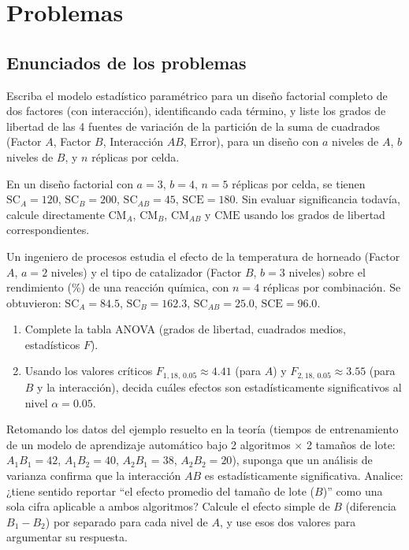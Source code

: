 \section*{Problemas}

\subsection*{Enunciados de los problemas}

\begin{problema}
	\label{prob:11b9df2}
	Escriba el modelo estadístico paramétrico para un diseño factorial completo de dos factores (con interacción), identificando cada término, y liste los grados de libertad de las 4 fuentes de variación de la partición de la suma de cuadrados (Factor $A$, Factor $B$, Interacción $AB$, Error), para un diseño con $a$ niveles de $A$, $b$ niveles de $B$, y $n$ réplicas por celda.
\end{problema}

\begin{problema}
	\label{prob:196fe5a}
	En un diseño factorial con $a=3$, $b=4$, $n=5$ réplicas por celda, se tienen $\text{SC}_A = 120$, $\text{SC}_B = 200$, $\text{SC}_{AB} = 45$, $\text{SCE} = 180$. Sin evaluar significancia todavía, calcule directamente $\text{CM}_A$, $\text{CM}_B$, $\text{CM}_{AB}$ y $\text{CME}$ usando los grados de libertad correspondientes.
\end{problema}

\begin{problema}
	\label{prob:414074b}
	Un ingeniero de procesos estudia el efecto de la temperatura de horneado (Factor $A$, $a=2$ niveles) y el tipo de catalizador (Factor $B$, $b=3$ niveles) sobre el rendimiento (\%) de una reacción química, con $n=4$ réplicas por combinación. Se obtuvieron: $\text{SC}_A = 84.5$, $\text{SC}_B = 162.3$, $\text{SC}_{AB} = 25.0$, $\text{SCE} = 96.0$.
	\begin{enumerate}
		\item Complete la tabla ANOVA (grados de libertad, cuadrados medios, estadísticos $F$).
		\item Usando los valores críticos $F_{1,18,\,0.05} \approx 4.41$ (para $A$) y $F_{2,18,\,0.05} \approx 3.55$ (para $B$ y la interacción), decida cuáles efectos son estadísticamente significativos al nivel $\alpha = 0.05$.
	\end{enumerate}
\end{problema}

\begin{problema}
	\label{prob:64cf64c}
	Retomando los datos del ejemplo resuelto en la teoría (tiempos de entrenamiento de un modelo de aprendizaje automático bajo 2 algoritmos $\times$ 2 tamaños de lote: $A_1B_1=42$, $A_1B_2=40$, $A_2B_1=38$, $A_2B_2=20$), suponga que un análisis de varianza confirma que la interacción $AB$ es estadísticamente significativa. Analice: ¿tiene sentido reportar ``el efecto promedio del tamaño de lote ($B$)'' como una sola cifra aplicable a ambos algoritmos? Calcule el efecto simple de $B$ (diferencia $B_1 - B_2$) por separado para cada nivel de $A$, y use esos dos valores para argumentar su respuesta.
\end{problema}

